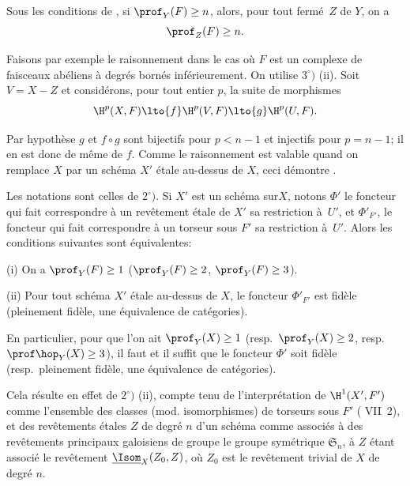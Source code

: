 \begin{corollaire} \label{XIV.1.3}
Sous les conditions de , si $\prof_Y(F)\geq n$, alors, pour tout ferm\'e~$Z$ de $Y$, on a
$$
\prof_Z(F)\geq n.
$$
\end{corollaire}

Faisons par exemple le raisonnement dans le cas o\`u $F$ est un complexe de faisceaux ab\'eliens \`a degr\'es born\'es inf\'erieurement. On utilise  $3^\circ)$ \textup{(ii)}. Soit $V=X-Z$ et consid\'erons, pour tout entier $p$, la suite de morphismes
$$
\H^p(X, F)\lto{f} \H^p(V, F)\lto{g} \H^p(U, F).
$$

Par hypoth\`ese $g$ et $f\circ g$ sont bijectifs pour $p<n-1$ et injectifs pour $p=n-1$; il en est donc de m\^eme de $f$. Comme le raisonnement est valable quand on remplace $X$ par un sch\'ema $X'$ \'etale au-dessus de $X$, ceci d\'emontre .

\begin{corollaire} \label{XIV.1.4} Les notations sont celles de  $2^\circ)$. Si $X'$ est un sch\'ema sur\pageoriginale $X$, notons $\Phi'$ le foncteur qui fait correspondre \`a un rev\^etement \'etale de $X'$ sa restriction \`a~$U'$, et $\Phi'_{F'}$, le foncteur qui fait correspondre \`a un torseur sous $F'$ sa restriction \`a~$U'$. Alors les conditions suivantes sont \'equivalentes:

\textup{(i)} On a $\prof_Y(F)\geq 1$ (\resp $\prof_Y(F)\geq 2$, \resp $\prof_Y(F)\geq 3$).

\textup{(ii)} Pour tout sch\'ema $X'$ \'etale au-dessus de $X$, le foncteur $\Phi'_{F'}$ est fid\`ele (\resp pleinement fid\`ele, \resp une \'equivalence de cat\'egories).

En particulier, pour que l'on ait $\prof_Y({X})\geq 1$ (resp.\ $\prof_Y({X})\geq 2$, resp.\ $\prof \hop_Y(X)\geq 3$), il faut et il suffit que le foncteur $\Phi'$ soit fid\`ele (resp.\ pleinement fid\`ele, \resp une \'equivalence de cat\'egories).
\end{corollaire}

Cela r\'esulte en effet de  $2^\circ)$ \textup{(ii)}, compte tenu de l'interpr\'etation de $\H^1(X', F')$ comme l'ensemble des classes (mod. isomorphismes) de torseurs sous $F'$ ( VII~2), et des rev\^etements \'etales $Z$ de degr\'e $n$ d'un sch\'ema comme associ\'es \`a des rev\^etements principaux galoisiens de groupe le groupe sym\'etrique $\mathfrak{S}_n$, \`a $Z$ \'etant associ\'e le rev\^etement $\underline{\Isom}_X(Z_0, Z)$, o\`u $Z_0$ est le rev\^etement trivial de $X$ de degr\'e $n$.

